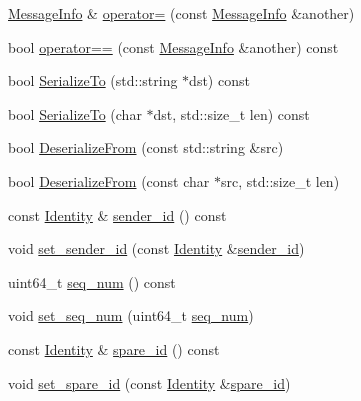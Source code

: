 \begin{DoxyCompactItemize}
\hyperlink{classapollo_1_1cyber_1_1transport_1_1MessageInfo}{Message\-Info} \& \hyperlink{classapollo_1_1cyber_1_1transport_1_1MessageInfo_a3e5affcf878f115503e388693f2be957}{operator=} (const \hyperlink{classapollo_1_1cyber_1_1transport_1_1MessageInfo}{Message\-Info} \&another)
\item 
bool \hyperlink{classapollo_1_1cyber_1_1transport_1_1MessageInfo_a303549cbf3624886b6d220b6a1f76457}{operator==} (const \hyperlink{classapollo_1_1cyber_1_1transport_1_1MessageInfo}{Message\-Info} \&another) const 
\item 
bool \hyperlink{classapollo_1_1cyber_1_1transport_1_1MessageInfo_a39b389826b1997bfe19fc2c88f322519}{Serialize\-To} (std\-::string $\ast$dst) const 
\item 
bool \hyperlink{classapollo_1_1cyber_1_1transport_1_1MessageInfo_ad88d5374dd1ed1616e119afd66d1c09d}{Serialize\-To} (char $\ast$dst, std\-::size\-\_\-t len) const 
\item 
bool \hyperlink{classapollo_1_1cyber_1_1transport_1_1MessageInfo_a52f208ec2fdaaf015dbee6a2be26f184}{Deserialize\-From} (const std\-::string \&src)
\item 
bool \hyperlink{classapollo_1_1cyber_1_1transport_1_1MessageInfo_a2c40187ca0ea8319a96a3f8b6a727c2b}{Deserialize\-From} (const char $\ast$src, std\-::size\-\_\-t len)
\item 
const \hyperlink{classapollo_1_1cyber_1_1transport_1_1Identity}{Identity} \& \hyperlink{classapollo_1_1cyber_1_1transport_1_1MessageInfo_a7c61d9db0a53649e8ad7f65e91bc3815}{sender\-\_\-id} () const 
\item 
void \hyperlink{classapollo_1_1cyber_1_1transport_1_1MessageInfo_afaf8b4a3937a29852afecca78d6b2596}{set\-\_\-sender\-\_\-id} (const \hyperlink{classapollo_1_1cyber_1_1transport_1_1Identity}{Identity} \&\hyperlink{classapollo_1_1cyber_1_1transport_1_1MessageInfo_a7c61d9db0a53649e8ad7f65e91bc3815}{sender\-\_\-id})
\item 
uint64\-\_\-t \hyperlink{classapollo_1_1cyber_1_1transport_1_1MessageInfo_af0935046db714cc4eef7211e6acc8274}{seq\-\_\-num} () const 
\item 
void \hyperlink{classapollo_1_1cyber_1_1transport_1_1MessageInfo_a286d05c1db0f97292d005067190bdef3}{set\-\_\-seq\-\_\-num} (uint64\-\_\-t \hyperlink{classapollo_1_1cyber_1_1transport_1_1MessageInfo_af0935046db714cc4eef7211e6acc8274}{seq\-\_\-num})
\item 
const \hyperlink{classapollo_1_1cyber_1_1transport_1_1Identity}{Identity} \& \hyperlink{classapollo_1_1cyber_1_1transport_1_1MessageInfo_a016351ea844d3192a46ec075b154aeb3}{spare\-\_\-id} () const 
\item 
void \hyperlink{classapollo_1_1cyber_1_1transport_1_1MessageInfo_a5335c6a9b563c9d3fcf35119a38283c0}{set\-\_\-spare\-\_\-id} (const \hyperlink{classapollo_1_1cyber_1_1transport_1_1Identity}{Identity} \&\hyperlink{classapollo_1_1cyber_1_1transport_1_1MessageInfo_a016351ea844d3192a46ec075b154aeb3}{spare\-\_\-id})
\end{DoxyCompactItemize}
